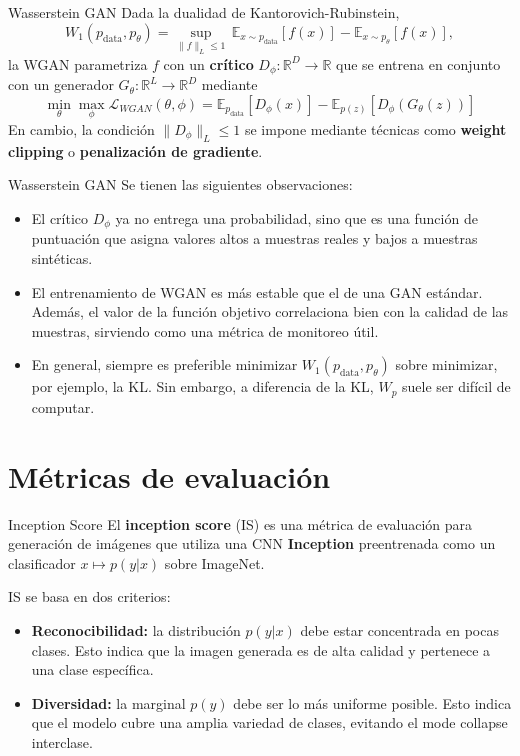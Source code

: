 \documentclass{beamer}
\newcommand{\R}{\mathbb{R}}
\begin{document}
\begin{frame}{Wasserstein GAN}
    Dada la dualidad de Kantorovich-Rubinstein,
    \begin{equation*}
        W_1(p_\text{data},p_\theta) = \sup_{\|f\|_L\leq 1}\,\mathbb{E}_{x\sim p_\text{data}}[f(x)] - \mathbb{E}_{x\sim p_\theta}[f(x)],
    \end{equation*}
    la WGAN parametriza $f$ con un \textbf{crítico} $D_\phi:\R^D\to\R$ que se entrena en conjunto con un generador $G_\theta:\R^L\to\R^D$ mediante
    \begin{equation*}
        \min_\theta \max_\phi \mathcal{L}_{WGAN}(\theta,\phi)   = \mathbb{E}_{p_\text{data}}[D_\phi(x)] - \mathbb{E}_{p(z)}[D_\phi(G_\theta(z))]
    \end{equation*}
    En cambio, la condición $\|D_\phi\|_L\leq 1$ se impone mediante técnicas como \textbf{weight clipping} o \textbf{penalización de gradiente}.
\end{frame}

\begin{frame}{Wasserstein GAN}
    Se tienen las siguientes observaciones:
    \begin{itemize}
        \item El crítico $D_\phi$ ya no entrega una probabilidad, sino que es una función de puntuación que asigna valores altos a muestras reales y bajos a muestras sintéticas.
        \item El entrenamiento de WGAN es más estable que el de una GAN estándar. Además, el valor de la función objetivo correlaciona bien con la calidad de las muestras, sirviendo como una métrica de monitoreo útil.
        \item En general, siempre es preferible minimizar $W_1(p_\text{data},p_\theta)$ sobre minimizar, por ejemplo, la KL. Sin embargo, a diferencia de la KL, $W_p$ suele ser difícil de computar.
    \end{itemize}
\end{frame}

\section{Métricas de evaluación}

\begin{frame}{Inception Score}
    El \textbf{inception score} (IS) es una métrica de evaluación para generación de imágenes que utiliza una CNN \textbf{Inception} preentrenada como un clasificador $x\mapsto p(y|x)$ sobre ImageNet.

    IS se basa en dos criterios:
    \begin{itemize}
        \item \textbf{Reconocibilidad:} la distribución $p(y|x)$ debe estar concentrada en pocas clases. Esto indica que la imagen generada es de alta calidad y pertenece a una clase específica.
        \item \textbf{Diversidad:} la marginal $p(y)$ debe ser lo más uniforme posible. Esto indica que el modelo cubre una amplia variedad de clases, evitando el mode collapse interclase.
    \end{itemize}
\end{frame}
\end{document}
